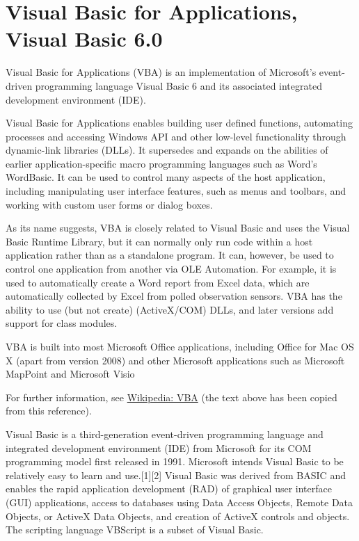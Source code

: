 \newpage
\section{Visual Basic for Applications, Visual Basic 6.0}

Visual Basic for Applications (VBA) is an implementation of Microsoft's event-driven programming language Visual Basic 6 and its associated integrated development environment (IDE).

\vpara
Visual Basic for Applications enables building user defined functions, automating processes and accessing Windows API and other low-level functionality through dynamic-link libraries (DLLs). It supersedes and expands on the abilities of earlier application-specific macro programming languages such as Word's WordBasic. It can be used to control many aspects of the host application, including manipulating user interface features, such as menus and toolbars, and working with custom user forms or dialog boxes.

\vpara
As its name suggests, VBA is closely related to Visual Basic and uses the Visual Basic Runtime Library, but it can normally only run code within a host application rather than as a standalone program. It can, however, be used to control one application from another via OLE Automation. For example, it is used to automatically create a Word report from Excel data, which are automatically collected by Excel from polled observation sensors. VBA has the ability to use (but not create) (ActiveX/COM) DLLs, and later versions add support for class modules.

\vpara
VBA is built into most Microsoft Office applications, including Office for Mac OS X (apart from version 2008) and other Microsoft applications such as Microsoft MapPoint and Microsoft Visio

For further information, see \href{http://en.wikipedia.org/wiki/Visual_Basic_for_Applications}{Wikipedia: VBA} (the text above has been copied from this reference).

\vpara
Visual Basic is a third-generation event-driven programming language and integrated development environment (IDE) from Microsoft for its COM programming model first released in 1991. Microsoft intends Visual Basic to be relatively easy to learn and use.[1][2] Visual Basic was derived from BASIC and enables the rapid application development (RAD) of graphical user interface (GUI) applications, access to databases using Data Access Objects, Remote Data Objects, or ActiveX Data Objects, and creation of ActiveX controls and objects. The scripting language VBScript is a subset of Visual Basic.

